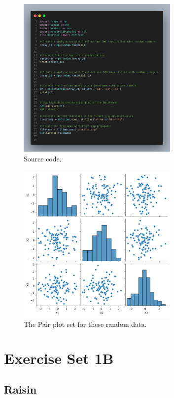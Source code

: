 \documentclass{article}
\begin{document}
		\begin{figure}[H]
			\centering
			\includegraphics[width=0.7\textwidth]{es1.png}
			\caption{Source code.}
		\end{figure}

		\begin{figure}[H]
			\centering
			\includegraphics[width=0.7\textwidth]{2024-09-21-12-25-38_pairplot.png}
			\caption{The Pair plot set for these random data.}
		\end{figure}

	\section{Exercise Set 1B}

		\subsection{Raisin}
\end{document}
